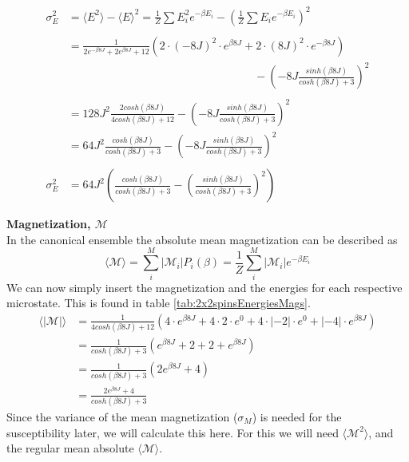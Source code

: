 \documentclass[../main.tex]{subfiles}
\begin{document}
    \begin{align*}
    \sigma^2_E &= \langle E^2 \rangle - \langle E \rangle ^2 = \frac{1}{Z}\sum E_i^2 e^{-\beta E_i} - \left( \frac{1}{Z} \sum E_i e^{-\beta E_i} \right)^2\\
    &\\
    &= \frac{1}{2e^{-\beta 8J} + 2e^{\beta 8J} + 12} \left( 2 \cdot (-8J)^2 \cdot e^{\beta 8J} + 2 \cdot (8J)^2 \cdot e^{-\beta 8J} \right)\\
    &\hspace{7cm} - \left(-8J\frac{sinh(\beta 8 J)}{cosh(\beta 8 J) + 3}\right)^2\\
        &\\
    &=128J^2\frac{2cosh(\beta 8J)}{4cosh(\beta 8 J) + 12} - \left(-8J\frac{sinh(\beta 8 J)}{cosh(\beta 8 J) + 3}\right)^2\\
    &=64J^2\frac{cosh(\beta 8J)}{cosh(\beta 8 J) + 3} - \left(-8J\frac{sinh(\beta 8 J)}{cosh(\beta 8 J) + 3}\right)^2\\
    &\\
    \sigma_E^2 &= 64J^2\left(\frac{cosh(\beta 8J)}{cosh(\beta 8 J) + 3} - \left(\frac{sinh(\beta 8 J)}{cosh(\beta 8 J) + 3}\right)^2\right)
    \end{align*}


    \textbf{Magnetization, $\mathcal{M}$}\\
    In the canonical ensemble the absolute mean magnetization can be described as
    \[\langle \mathcal{M} \rangle = \sum_i^M |\mathcal{M}_i| P_i(\beta) = \frac{1}{Z} \sum_i^M |\mathcal{M}_i| e^{-\beta E_i}\]
    We can now simply insert the magnetization and the energies for each respective microstate. This is found in table \ref{tab:2x2spinsEnergiesMags}.
    \begin{align*}
      \langle \mathcal{|M|} \rangle &= \frac{1}{4cosh(\beta 8J) + 12} \left( 4 \cdot e^{\beta8J} + 4 \cdot 2 \cdot e^{0} + 4 \cdot |-2| \cdot e^{0} + |-4| \cdot e^{\beta 8J} \right)\\
      &= \frac{1}{cosh(\beta 8J) + 3} \left( e^{\beta 8J} + 2 +2 +e^{\beta 8J} \right)\\
      &=\frac{1}{cosh(\beta 8J) + 3} \left( 2e^{\beta 8J} + 4 \right)\\
      &=\frac{ 2e^{\beta 8J} + 4}{cosh(\beta 8J) + 3}
    \end{align*}
    Since the variance of the mean magnetization ($\sigma_M$) is needed for the susceptibility later, we will calculate this here. For this we will need $\langle \mathcal{M}^2 \rangle$, and the regular mean absolute $\langle \mathcal{M} \rangle$.
\end{document}

